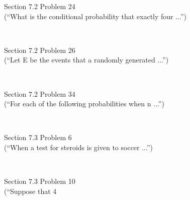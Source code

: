 \documentclass[11pt]{exam}
\begin{document}
\begin{questions}
\begin{solution}
\end{solution}
\question[2] Section 7.2 Problem 24\\
(“What is the conditional probability that exactly four ...”) 
\begin{solution}\\



\end{solution}
\question[2] Section 7.2 Problem 26\\
(“Let E be the events that a randomly generated ...”) 
\begin{solution}\\



\end{solution}
\question[4] Section 7.2 Problem 34\\
(“For each of the following probabilities when n ...”) 
\begin{solution}\\



\end{solution}
\question[2] Section 7.3 Problem 6\\
(“When a test for steroids is given to soccer ...”) 
\begin{solution}\\



\end{solution}
\question[6] Section 7.3 Problem 10\\
(“Suppose that 4%
\begin{solution}\\




\end{solution}
\end{questions}
\end{document}
